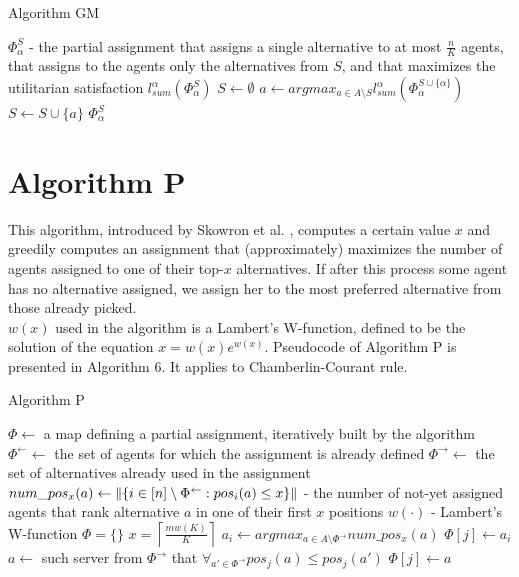 \begin{algorithm}
\caption{Algorithm GM}\label{euclid}
\begin{algorithmic}[1]
		\State $\Phi^{S}_{\alpha}$ - the partial assignment that assigns a single alternative to at most $\frac{n}{K}$ agents, that assigns to the agents only the alternatives from $S$, and that maximizes the utilitarian satisfaction $l^{\alpha}_{sum}(\Phi^{S}_{\alpha})$
		\State $S \gets \emptyset$
			\State $a \gets argmax_{a \in A \setminus S} l^{\alpha}_{sum} (\Phi^{S \cup \{\alpha\}}_{\alpha})$
			\State $S \gets S \cup \{a\}$
		\EndFor
		\State \Return $\Phi^{S}_{\alpha}$
	\EndProcedure
\end{algorithmic}
\end{algorithm}

\section{Algorithm P}

This algorithm, introduced by Skowron et al. \cite{1}, computes a certain value $x$ and greedily computes an assignment that (approximately) maximizes the number of agents assigned to one of their top-$x$ alternatives. If after this process some agent has no alternative assigned, we assign her to the most preferred alternative from those already picked.
\\

$w(x)$ used in the algorithm is a Lambert's W-function, defined to be the solution of the equation $x = w(x)e^{w(x)}$. Pseudocode of Algorithm P is presented in Algorithm 6. It applies to Chamberlin-Courant rule.

\begin{algorithm}
\caption{Algorithm P}\label{euclid}
\begin{algorithmic}[1]
		\State $\Phi \gets$ a map defining a partial assignment, iteratively built by the algorithm
		\State $\Phi^{\leftarrow} \gets$ the set of agents for which the assignment is already defined
		\State $\Phi^{\rightarrow} \gets$ the set of alternatives already used in the assignment
		\State $num\_pos_{x}(a) \gets \lVert\left\{ i \in [n] \setminus \Phi^{\leftarrow} : pos_{i}(a) \leq x \right\}\rVert$ - the number of not-yet assigned agents that rank alternative $a$ in one of their first $x$ positions
		\State $w(\cdot)$ - Lambert's W-function
		\State $\Phi = \{\}$
		\State $x = \left\lceil \frac{mw(K)}{K} \right\rceil$
			\State $a_{i} \gets argmax_{a \in A \setminus \Phi^{\rightarrow}} num\_pos_{x}(a)$
					\State $\Phi[j] \gets a_{i}$
				\EndIf
			\EndFor
		\EndFor
			\State $a \gets$ such server from $\Phi^{\rightarrow}$ that $\forall_{a' \in \Phi^{\rightarrow}} pos_{j}(a) \leq pos_{j}(a')$
			\State $\Phi[j] \gets a$
		\EndFor
	\EndProcedure
\end{algorithmic}
\end{algorithm}

